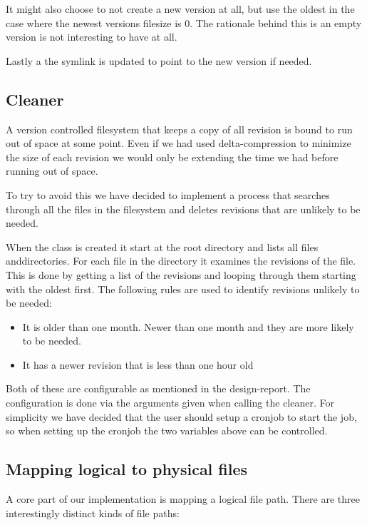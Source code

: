 \documentclass[12pt]{article}
\begin{document}
It might also choose to not create a new version at all, but use the
oldest in the case where the newest versions filesize is 0. The
rationale behind this is an empty version is not interesting to have
at all.

Lastly a the symlink is updated to point to the new version if needed.

\subsection{Cleaner}

A version controlled filesystem that keeps a copy of all revision is bound to
run out of space at some point. Even if we had used delta-compression to
minimize the size of each revision we would only be extending the time we had
before running out of space.

To try to avoid this we have decided to implement a process that searches
through all the files in the filesystem and deletes revisions that are unlikely
to be needed.

When the class is created it start at the root directory and lists all files
anddirectories. For each file in the directory it examines the revisions of the
file.
This is done by getting a list of the revisions and looping through them
starting with the oldest first.
The following rules are used to identify revisions unlikely to be needed:

\begin{itemize}
\item It is older than one month. Newer than one month and they are more likely
to be needed.
\item It has a newer revision that is less than one hour old
\end{itemize}

Both of these are configurable as mentioned in the design-report. The
configuration is done via the arguments given when calling the cleaner. For
simplicity we have decided that the user should setup a cronjob to start the
job, so when setting up the cronjob the two variables above can be controlled.


\subsection{Mapping logical to physical files}

A core part of our implementation is mapping a logical file path.
There are three interestingly distinct kinds of file paths:
\end{document}
